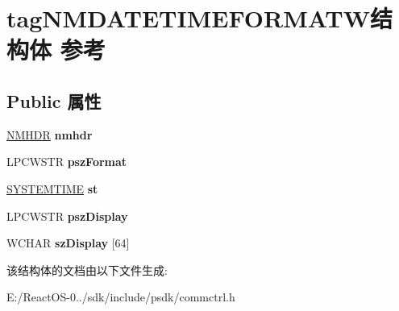 \hypertarget{structtag_n_m_d_a_t_e_t_i_m_e_f_o_r_m_a_t_w}{}\section{tag\+N\+M\+D\+A\+T\+E\+T\+I\+M\+E\+F\+O\+R\+M\+A\+T\+W结构体 参考}
\label{structtag_n_m_d_a_t_e_t_i_m_e_f_o_r_m_a_t_w}
\subsection*{Public 属性}
\begin{DoxyCompactItemize}
\item 
\mbox{\label{structtag_n_m_d_a_t_e_t_i_m_e_f_o_r_m_a_t_w_a82dec9daec90a6ab1e8590343aca1792}} 
\hyperlink{structtag_n_m_h_d_r}{N\+M\+H\+DR} {\bfseries nmhdr}
\item 
\mbox{\label{structtag_n_m_d_a_t_e_t_i_m_e_f_o_r_m_a_t_w_aed2f2dee18d5184ff00dc2ce3f3634c0}} 
L\+P\+C\+W\+S\+TR {\bfseries psz\+Format}
\item 
\mbox{\label{structtag_n_m_d_a_t_e_t_i_m_e_f_o_r_m_a_t_w_ac4c661cc0a022dd447632281a5a6cdf1}} 
\hyperlink{struct___s_y_s_t_e_m_t_i_m_e}{S\+Y\+S\+T\+E\+M\+T\+I\+ME} {\bfseries st}
\item 
\mbox{\label{structtag_n_m_d_a_t_e_t_i_m_e_f_o_r_m_a_t_w_aaa66b8ebaa6d7f32e7e2ad8bc3a42fa7}} 
L\+P\+C\+W\+S\+TR {\bfseries psz\+Display}
\item 
\mbox{\label{structtag_n_m_d_a_t_e_t_i_m_e_f_o_r_m_a_t_w_a43b86590c551caefb4231cb46eec15be}} 
W\+C\+H\+AR {\bfseries sz\+Display} \mbox{[}64\mbox{]}
\end{DoxyCompactItemize}


该结构体的文档由以下文件生成\+:\begin{DoxyCompactItemize}
\item 
E\+:/\+React\+O\+S-\/0../sdk/include/psdk/commctrl.\+h\end{DoxyCompactItemize}

